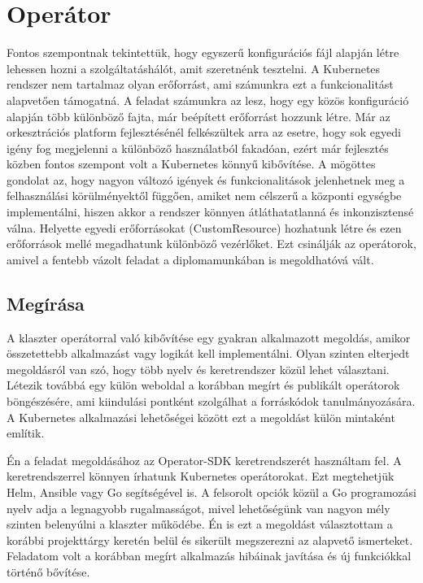 \section{Operátor}
Fontos szempontnak tekintettük, hogy egyszerű konfigurációs fájl alapján létre lehessen hozni a szolgáltatáshálót, amit szeretnénk tesztelni.
A Kubernetes rendszer nem tartalmaz olyan erőforrást, ami számunkra ezt a funkcionalitást alapvetően támogatná.
A feladat számunkra az lesz, hogy egy közös konfiguráció alapján több különböző fajta, már beépített erőforrást hozzunk létre.
Már az orkesztrációs platform fejlesztésénél felkészültek arra az esetre, hogy sok egyedi igény fog megjelenni a különböző használatból fakadóan, ezért már fejlesztés közben fontos szempont volt a Kubernetes könnyű kibővítése.
A mögöttes gondolat az, hogy nagyon változó igények és funkcionalitások jelenhetnek meg a felhasználási körülményektől függően, amiket nem célszerű a központi egységbe implementálni, hiszen akkor a rendszer könnyen átláthatatlanná és inkonzisztensé válna.
Helyette egyedi erőforrásokat (CustomResource) hozhatunk létre és ezen erőforrások mellé megadhatunk különböző vezérlőket. Ezt csinálják az operátorok, amivel a fentebb vázolt feladat a diplomamunkában is megoldhatóvá vált.

\subsection{Megírása}
A klaszter operátorral való kibővítése egy gyakran alkalmazott megoldás, amikor összetettebb alkalmazást vagy logikát kell implementálni.
Olyan szinten elterjedt megoldásról van szó, hogy több nyelv és keretrendszer közül lehet választani\citep{availableOperatorFrameworks}.
Létezik továbbá egy külön weboldal a korábban megírt és publikált operátorok böngészésére, ami kiindulási pontként szolgálhat a forráskódok tanulmányozására.\citep{operatorhub} 
A Kubernetes alkalmazási lehetőségei között ezt a megoldást külön mintaként említik.\citep{KubernetesPatterns} 

Én a feladat megoldásához az Operator-SDK\citep{operatorSDK} keretrendszerét használtam fel. 
A keretrendszerrel könnyen írhatunk Kubernetes operátorokat.
Ezt megtehetjük Helm, Ansible vagy Go segítségével is.
A felsorolt opciók közül a Go programozási nyelv adja a legnagyobb rugalmasságot, mivel lehetőségünk van nagyon mély szinten belenyúlni a klaszter működébe.
Én is ezt a megoldást választottam a korábbi projekttárgy keretén belül és sikerült megszerezni az alapvető ismerteket. 
Feladatom volt a korábban megírt alkalmazás hibáinak javítása és új funkciókkal történő bővítése.

